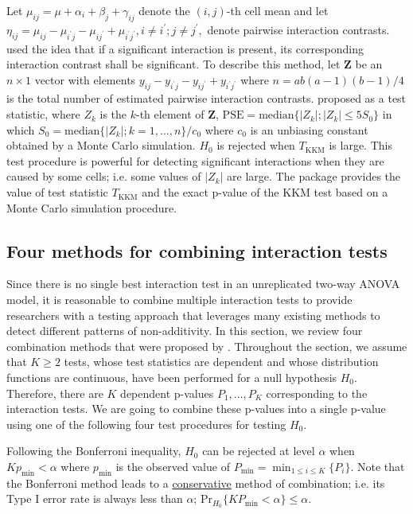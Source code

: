 \noindent {} Let $\mu_{ij}=\mu +\alpha_i+\beta _j+\gamma _{ij}$ denote the $\left(i,j\right)$-th cell mean and let $\eta_{ij}=\mu_{ij}-\mu_{i^{\prime}j}-\mu_{ij^{\prime}}+\mu_{i^{\prime}j^{\prime}}, i\neq i^{\prime}; j \neq j^{\prime},$ denote pairwise interaction contrasts. \citet{KKM:2016} used the idea that if {a significant interaction is present}, its corresponding interaction contrast shall be significant. To describe this method, let $\mathbold{Z}$ be an $n\times 1$ vector with elements $y_{ij}-y_{i^{\prime}j}-y_{ij^{\prime}}+y_{i^{\prime}j^{\prime}}$ where $n=ab\left(a-1\right)\left(b-1\right)/4$ is the total number of estimated pairwise interaction contrasts. \citet{KKM:2016} proposed 
as a test statistic, where $Z_k$ is the $k$-th element of $\mathbold{Z}$, $\text{PSE}=\text{median}\{|Z_k|; |Z_k|\leq 5S_0\}$ in which $S_0=\text{median}\{|Z_k|; k=1,…,n\}/c_0$ where $c_0$ is an unbiasing constant obtained by a Monte Carlo simulation. $H_0$ is rejected when $T_{\text{KKM}}$ is large. {This test procedure is powerful for detecting} significant interactions when they are caused by some cells; i.e. some values of $|Z_k|$ are large. The package  provides the value of test statistic $T_{\text{KKM}}$ and the exact p-value of the KKM test based on a Monte Carlo simulation procedure.

\subsection{Four methods for combining interaction tests}
Since {there is no single best interaction test} in an unreplicated two-way ANOVA model, it is reasonable to combine multiple interaction tests to provide researchers with a testing approach that leverages many existing methods to detect different patterns of non-additivity. In this section, we review four combination methods that were proposed by \citet{SKK:2018}. Throughout the section, we assume that $K \geq 2$ tests, whose test statistics are dependent and whose distribution functions are continuous, have been performed for a null hypothesis $H_0$. Therefore, there are $K$ dependent p-values $P_1, \ldots, P_K$ corresponding to the interaction tests. We are going to combine these p-values into a single p-value using one of the following four test procedures for testing $H_0$.

\noindent {} Following the Bonferroni inequality, $H_0$ can be rejected at level $\alpha$ when $Kp_{\text{min}}<\alpha$  where $p_{\text{min}}$ is the observed value of $P_{\text{min}}=\min_{1 \leq i \leq K} \{ P_i \}$. Note that the Bonferroni method leads to a \underline{conservative} method of combination; i.e. its {Type I error} rate is always less than $\alpha$; $\text{Pr}_{H_0}\{ KP_{\text{min}}<\alpha \} \leq \alpha$. 

